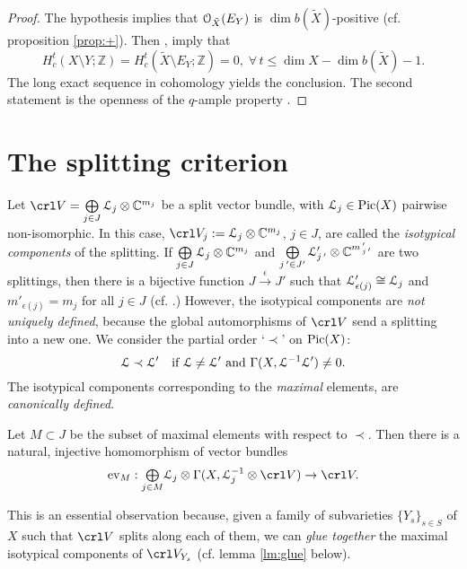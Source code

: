 \documentclass[11pt,reqno]{amsart}
\let\euf\EuScript
\let\mbb\mathbb
\let\tld\tilde
\let\nit\noindent
\let\srel\stackrel
\numberwithin{equation}{section}
\numberwithin{figure}{section}
\let\sm\setminus
\let\les\leqslant
\begin{document}
\begin{proof}
The hypothesis implies that ${{\euf O}}_{\tld X}(E_Y)$ is $\dim b(\tld X)$-positive 
(cf. proposition \ref{prop:+}). Then \cite[Theorem III$\,$]{bott-lefschetz}, 
\cite[Lemma 10.1]{ot} imply that 
$$
H^t_c(X\sm Y;\mbb Z)=H^t_c(\tld X\sm E_Y;\mbb Z)=0,
\;\forall\,t\les\dim X-\dim b(\tld X)-1.
$$
The long exact sequence in cohomology yields the conclusion. 
The second statement is the openness of the $q$-ample property \cite[Theorem 8.1]{to}. 
\end{proof}

\section{The splitting criterion}\label{sct:split-crit}

Let $\crl V ={{\overset{{}}{\underset{{j\in J}}{{\mbox{$\bigoplus$}}}}}}\,{{\euf L}}_j\otimes{{\mbb C}}^{m_j}$ 
be a split vector bundle, with ${{\euf L}}_j\in{\mathop{\rm Pic}\nolimits}(X)$ pairwise non-isomorphic. 
In this case, $\crl V_j:={{\euf L}}_j\otimes{{\mbb C}}^{m_j}$, ${j\in J}$, are called the 
{\em isotypical components} of the splitting. 
If ${{\overset{{}}{\underset{{j\in J}}{{\mbox{$\bigoplus$}}}}}}\,{{\euf L}}_j\otimes{{\mbb C}}^{m_j}$ and 
${{\overset{{}}{\underset{{j\,'\in J'}}{{\mbox{$\bigoplus$}}}}}}\,{{\euf L}}'_{j\,'}\otimes{{\mbb C}}^{m\,'_{j\,'}}$ are 
two splittings, then there is a bijective function $J\srel{\epsilon}{\to} J'$ 
such that ${{\euf L}}'_{\epsilon(j)}\cong{{\euf L}}_j$ and $m'_{\epsilon(j)}=m_j$ for all $j\in J$ 
(cf. \cite[Theorem 1 and 2]{at}.) However, the isotypical components are 
{\em not uniquely defined}, because the global automorphisms of $\crl V$ send a 
splitting into a new one. We consider the partial order `$\prec$' on ${\mathop{\rm Pic}\nolimits}(X)$: 
\begin{equation}\label{eq:order}
{{\euf L}}\prec{{\euf L}}'\quad\text{if }{{\euf L}}\neq{{\euf L}}'\text{ and }\Gamma(X,{{\euf L}}^{-1}{{\euf L}}')\neq 0.
\end{equation}
The isotypical components corresponding to the 
\emph{maximal} elements, are \emph{canonically defined}. 

\begin{m-lemma}\label{lm:max}
Let $M\subset J$ be the subset of maximal elements with respect to $\prec$. 
Then there is a natural, injective homomorphism of vector bundles 
\begin{equation}\label{eq:evm}
{{\rm ev}}_M:\underset{j\in M}{\mbox{$\bigoplus$}}
{{\euf L}}_j\otimes\Gamma(X,{{\euf L}}_j^{-1}\otimes\crl V)
\to \crl V.
\end{equation}
\end{m-lemma}
\nit This is an essential observation because, 
given a family of subvarieties $\{Y_s\}_{s\in S}$ of $X$ such that $\crl V$ splits along 
each of them, we can \textit{glue together} the maximal isotypical components of 
$\crl V_{Y_s}$ (cf. lemma \ref{lm:glue} below). 
\end{document}
